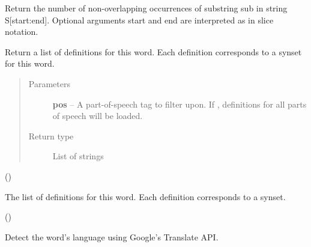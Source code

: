 \documentclass[letterpaper,10pt,english]{sphinxmanual}
\begin{document}
\begin{fulllineitems}

\begin{fulllineitems}
\label{api_reference:textblob_de.blob.Word.count}
Return the number of non-overlapping occurrences of substring sub in
string S{[}start:end{]}.  Optional arguments start and end are
interpreted as in slice notation.

\end{fulllineitems}


\begin{fulllineitems}
\label{api_reference:textblob_de.blob.Word.define}
Return a list of definitions for this word. Each definition
corresponds to a synset for this word.
\begin{quote}\begin{description}
\item[{Parameters}] \leavevmode
\textbf{pos} -- A part-of-speech tag to filter upon. If , definitions
for all parts of speech will be loaded.

\item[{Return type}] \leavevmode
List of strings

\end{description}\end{quote}

()

\end{fulllineitems}


\begin{fulllineitems}
\label{api_reference:textblob_de.blob.Word.definitions}
The list of definitions for this word. Each definition corresponds
to a synset.

()

\end{fulllineitems}


\begin{fulllineitems}
\label{api_reference:textblob_de.blob.Word.detect_language}
Detect the word's language using Google's Translate API.


\end{fulllineitems}
\end{fulllineitems}
\end{document}
